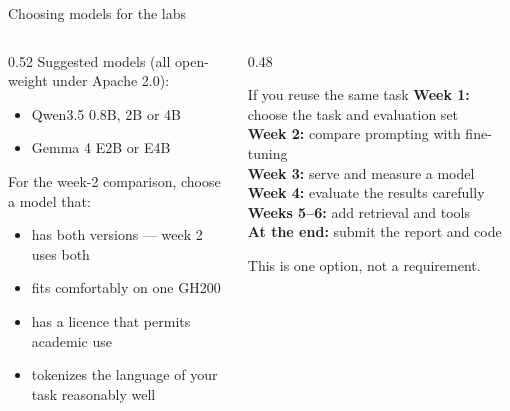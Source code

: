 \documentclass[aspectratio=169,10pt]{beamer}
\begin{document}
\begin{frame}{Choosing models for the labs}
  \begin{columns}[T]
    \begin{column}{0.52\textwidth}
      Suggested models (all open-weight under Apache 2.0):
      \begin{itemize}
        \item Qwen3.5 0.8B, 2B or 4B
        \item Gemma 4 E2B or E4B
      \end{itemize}
      \vspace{0.6em}
      For the week-2 comparison, choose a model that:
      \begin{itemize}
        \item has both  versions --- week 2 uses both
        \item fits comfortably on one GH200
        \item has a licence that permits academic use
        \item tokenizes the language of your task reasonably well
      \end{itemize}
    \end{column}
    \begin{column}{0.48\textwidth}
      \begin{block}{If you reuse the same task}
        \footnotesize
        \textbf{Week 1:} choose the task and evaluation set\\
        \textbf{Week 2:} compare prompting with fine-tuning\\
        \textbf{Week 3:} serve and measure a model\\
        \textbf{Week 4:} evaluate the results carefully\\
        \textbf{Weeks 5--6:} add retrieval and tools\\
        \textbf{At the end:} submit the report and code
      \end{block}
      \small
      This is one option, not a requirement.
    \end{column}
  \end{columns}
\end{frame}
\end{document}
